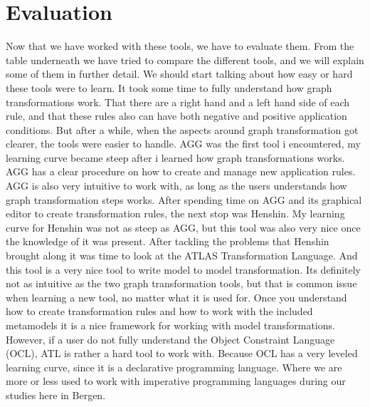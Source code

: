 \documentclass[pdftex,11pt,a4paper]{article}
\begin{document}
\section{Evaluation}
\noindent Now that we have worked with these tools, we have to evaluate them.
From the table underneath we have tried to compare the different tools, and we
will explain some of them in further detail. We should start talking about how
easy or hard these tools were to learn. It took some time to fully understand
how graph transformations work. That there are a right hand and a left hand
side of each rule, and that these rules also can have both negative and
positive application conditions. But after a while, when the aspects around
graph transformation got clearer, the tools were easier to handle. AGG was the
first tool i encountered, my learning curve became steep after i learned how
graph transformations works. AGG has a clear procedure on how to create and
manage new application rules. AGG is also very intuitive to work with, as long
as the users understands how graph transformation steps works. After spending
time on AGG and its graphical editor to create transformation rules, the next
stop was Henshin. My learning curve for Henshin was not as steep as AGG, but
this tool was also very nice once the knowledge of it was present. After
tackling the problems that Henshin brought along it was time to look at the
ATLAS Transformation Language. And this tool is a very nice tool to write model
to model transformation. Its definitely not as intuitive as the two graph
transformation tools, but that is common issue when learning a new tool, no
matter what it is used for. Once you understand how to create transformation
rules and how to work with the included metamodels it is a nice framework for
working with model transformations. However, if a user do not fully understand
the Object Constraint Language (OCL), ATL is rather a hard tool to work with.
Because OCL has a very leveled learning curve, since it is a declarative
programming language. Where we are more or less used to work with imperative
programming languages during our studies here in Bergen.
\end{document}
